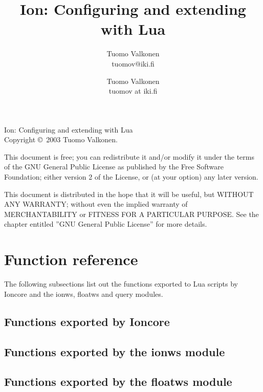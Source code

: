 \documentclass[english,a4paper,11pt,oldtoc,mctitle]{rapport3}
\title{Ion: Configuring and extending with Lua}
\author{Tuomo Valkonen \\ tuomov@iki.fi}
\author{Tuomo Valkonen \\ tuomov at iki.fi}
\begin{document}
\maketitle

Ion: Configuring and extending with Lua\\
Copyright \copyright\  2003 Tuomo Valkonen.

This document is free; you can redistribute it and/or modify
it under the terms of the GNU General Public License as published by
the Free Software Foundation; either version 2 of the License, or
(at your option) any later version.

This document is distributed in the hope that it will be useful,
but WITHOUT ANY WARRANTY; without even the implied warranty of
MERCHANTABILITY or FITNESS FOR A PARTICULAR PURPOSE.  See the
chapter entitled ''GNU General Public License'' for more details.

\tableofcontents











\chapter{Function reference}
\label{sec:exports}

The following subsections list out the functions exported to Lua scripts
by Ioncore and the ionws, floatws and query modules.

\section{Functions exported by Ioncore}
\label{sec:ioncoreref}



\section{Functions exported by the ionws module}
\label{sec:ionwsref}



\section{Functions exported by the floatws module}
\label{sec:floatwsref}
\end{document}
